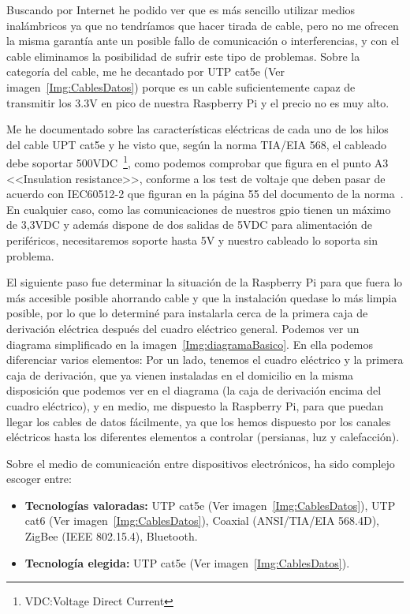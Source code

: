 Buscando por Internet he podido ver que es más sencillo utilizar medios inalámbricos ya que no tendríamos que hacer tirada de cable, pero no me ofrecen la misma garantía ante un posible fallo de comunicación o interferencias, y con el cable eliminamos la posibilidad de sufrir este tipo de problemas. Sobre la categoría del cable, me he decantado por UTP cat5e (Ver imagen~\ref{Img:CablesDatos}) porque es un cable suficientemente capaz de transmitir los 3.3V en pico de nuestra Raspberry Pi y el precio no es muy alto.

Me he documentado sobre las características eléctricas de cada uno de los hilos del cable UPT cat5e y he visto que, según la norma TIA/EIA 568, el cableado debe soportar 500VDC~\footnote{VDC:Voltage Direct Current}, como podemos comprobar que figura en el punto A3 <<Insulation resistance>>, conforme a los test de voltaje que deben pasar de acuerdo con IEC60512-2 que figuran en la página 55 del documento de la norma~\cite{manual:568.2}. En cualquier caso, como las comunicaciones de nuestros gpio tienen un máximo de 3,3VDC y además dispone de dos salidas de 5VDC para alimentación de periféricos, necesitaremos soporte hasta 5V y nuestro cableado lo soporta sin problema.


El siguiente paso fue determinar la situación de la Raspberry Pi para que fuera lo más accesible posible ahorrando cable y que la instalación quedase lo más limpia posible, por lo que lo determiné para instalarla cerca de la primera caja de derivación eléctrica después del cuadro eléctrico general. Podemos ver un diagrama simplificado en la imagen~\ref{Img:diagramaBasico}. En ella podemos diferenciar varios elementos: Por un lado, tenemos el cuadro eléctrico y la primera caja de derivación, que ya vienen instaladas en el domicilio en la misma disposición que podemos ver en el diagrama (la caja de derivación encima del cuadro eléctrico), y en medio, me dispuesto la Raspberry Pi, para que puedan llegar los cables de datos fácilmente, ya que los hemos dispuesto por los canales eléctricos hasta los diferentes elementos a controlar (persianas, luz y calefacción).



Sobre el medio de comunicación entre dispositivos electrónicos, ha sido complejo escoger entre:
\begin{itemize}
    \item \textbf{Tecnologías valoradas:} UTP cat5e (Ver imagen~\ref{Img:CablesDatos}), UTP cat6 (Ver imagen~\ref{Img:CablesDatos}), Coaxial (ANSI/TIA/EIA 568.4D), ZigBee (IEEE 802.15.4), Bluetooth\cite{manual:IEEE802.11}. 
    \item \textbf{Tecnología elegida:} UTP cat5e (Ver imagen~\ref{Img:CablesDatos}).
\end{itemize}

